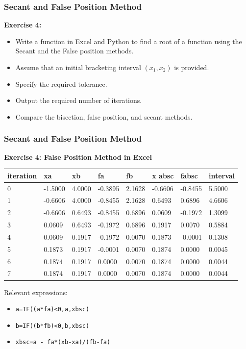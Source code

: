 \begin{frame}[fragile]
    \frametitle{Secant and False Position Method}

    \textbf{Exercise 4:}
    \begin{itemize}
      \item Write a function in Excel and Python to find a root of a function using the Secant and the False position methods.
      \item Assume that an initial bracketing interval \((x_1, x_2)\) is provided.
      \item Specify the required tolerance.
      \item Output the required number of iterations.
      \item Compare the bisection, false position, and secant methods.
    \end{itemize}
\end{frame}

\begin{frame}[fragile]
    \frametitle{Secant and False Position Method}

    \textbf{Exercise 4: False Position Method in Excel}
    \begin{table}[]
      \begin{tabular}{|l|l|l|l|l|l|l|l|}
      \hline
      iteration & xa      & xb     & fa      & fb     & x absc  & fabsc   & interval \\ \hline
      0         & -1.5000 & 4.0000 & -0.3895 & 2.1628 & -0.6606 & -0.8455 & 5.5000   \\ \hline
      1         & -0.6606 & 4.0000 & -0.8455 & 2.1628 & 0.6493  & 0.6896  & 4.6606   \\ \hline
      2         & -0.6606 & 0.6493 & -0.8455 & 0.6896 & 0.0609  & -0.1972 & 1.3099   \\ \hline
      3         & 0.0609  & 0.6493 & -0.1972 & 0.6896 & 0.1917  & 0.0070  & 0.5884   \\ \hline
      4         & 0.0609  & 0.1917 & -0.1972 & 0.0070 & 0.1873  & -0.0001 & 0.1308   \\ \hline
      5         & 0.1873  & 0.1917 & -0.0001 & 0.0070 & 0.1874  & 0.0000  & 0.0045   \\ \hline
      6         & 0.1874  & 0.1917 & 0.0000  & 0.0070 & 0.1874  & 0.0000  & 0.0044   \\ \hline
      7         & 0.1874  & 0.1917 & 0.0000  & 0.0070 & 0.1874  & 0.0000  & 0.0044   \\ \hline
      \end{tabular}
      \end{table}
    Relevant expressions: 
    \begin{itemize}
      \item \texttt{a=IF((a*fa)<0,a,xbsc)}
      \item \texttt{b=IF((b*fb)<0,b,xbsc)}
      \item \texttt{xbsc=a - fa*(xb-xa)/(fb-fa)}
    \end{itemize}
\end{frame}

